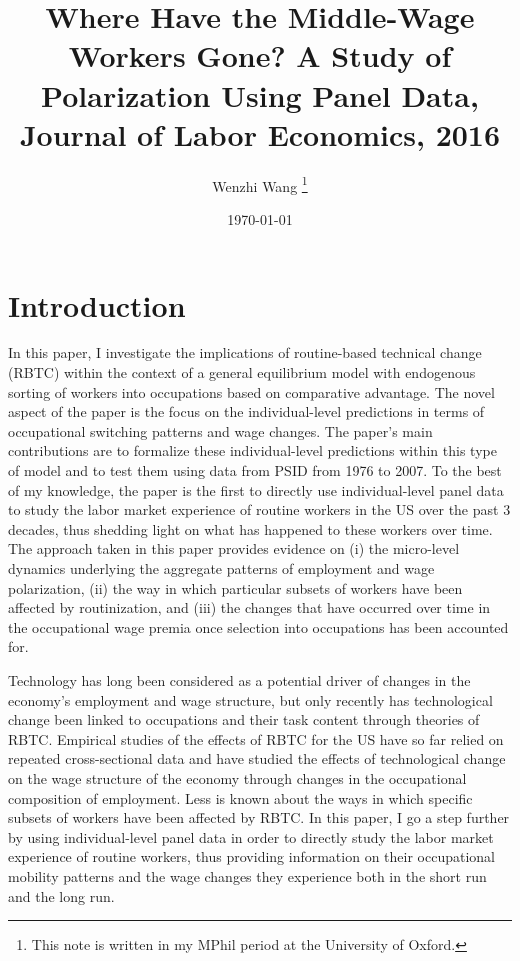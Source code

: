 \documentclass[12pt]{article}
\theoremstyle{definition}
\begin{document}

\title{\bf Where Have the Middle-Wage Workers Gone? A Study of Polarization Using Panel Data, Journal of Labor Economics, 2016}
\author{Wenzhi Wang \thanks{This note is written in my MPhil period at the University of Oxford.} } 
\date{\today}
\maketitle

\citet{cortesWhereHaveMiddleWage2016}


\section{Introduction}

In this paper, I investigate the implications of routine-based technical change (RBTC) within the context of a general equilibrium model with endogenous sorting of workers into occupations based on comparative advantage. The novel aspect of the paper is the focus on the individual-level predictions in terms of occupational switching patterns and wage changes. The paper's main contributions are to formalize these individual-level predictions within this type of model and to test them using data from PSID from 1976 to 2007. To the best of my knowledge, the paper is the first to directly use individual-level panel data to study the labor market experience of routine workers in the US over the past 3 decades, thus shedding light on what has happened to these workers over time. The approach taken in this paper provides evidence on (i) the micro-level dynamics underlying the aggregate patterns of employment and wage polarization, (ii) the way in which particular subsets of workers have been affected by routinization, and (iii) the changes that have occurred over time in the occupational wage premia once selection into occupations has been accounted for. 

Technology has long been considered as a potential driver of changes in the economy's employment and wage structure, but only recently has technological change been linked to occupations and their task content through theories of RBTC. Empirical studies of the effects of RBTC for the US have so far relied on repeated cross-sectional data and have studied the effects of technological change on the wage structure of the economy through changes in the occupational composition of employment. Less is known about the ways in which specific subsets of workers have been affected by RBTC. In this paper, I go a step further by using individual-level panel data in order to directly study the labor market experience of routine workers, thus providing information on their occupational mobility patterns and the wage changes they experience both in the short run and the long run. 
\end{document}
